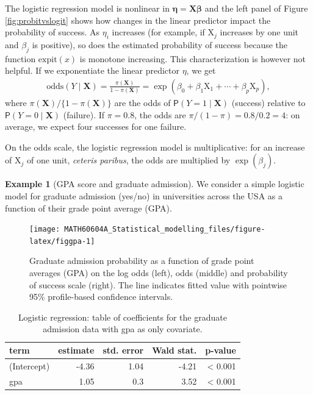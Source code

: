 \documentclass[
  11pt,
  letterpaper,
]{book}
\theoremstyle{definition}
\theoremstyle{definition}
\newtheorem{example}{Example}[chapter]
\theoremstyle{definition}
\theoremstyle{remark}
\begin{document}
The logistic regression model is nonlinear in \(\boldsymbol{\eta}=\mathbf{X}\boldsymbol{\beta}\) and the left panel of Figure \ref{fig:probitvslogit} shows how changes in the linear predictor impact the probability of success. As \(\eta_i\) increases (for example, if \(\mathrm{X}_j\) increases by one unit and \(\beta_j\) is positive), so does the estimated probability of success because the function \(\mathrm{expit}(x)\) is monotone increasing. This characterization is however not helpful.
If we exponentiate the linear predictor \(\eta\), we get
\begin{align*}
\mathrm{odds}(Y\mid \mathbf{X}) = \frac{\pi(\mathbf{X})}{1-\pi(\mathbf{X})}=\exp(\beta_0+ \beta_1 \mathrm{X}_1 + \cdots + \beta_p\mathrm{X}_p),
\end{align*}
where \(\pi(\mathbf{X})/\{1-\pi(\mathbf{X})\}\) are the odds of \(\mathsf{P}(Y=1 \mid \mathbf{X})\) (success) relative to \(\mathsf{P}(Y=0 \mid\mathbf{X})\) (failure). If \(\pi=0.8\), the odds are \(\pi/(1-\pi) = 0 .8/0.2 = 4\): on average, we expect four successes for one failure.

On the odds scale, the logistic regression model is multiplicative: for an increase of \(\mathrm{X}_j\) of one unit, \emph{ceteris paribus}, the odds are multiplied by \(\exp(\beta_j)\).

\begin{example}[GPA score and graduate admission]
\protect\hypertarget{exm:gpaexample}{}{\label{exm:gpaexample} {} }We consider a simple logistic model for graduate admission (yes/no) in universities across the USA as a function of their grade point average (GPA).
\end{example}

\begin{figure}

{\centering \texttt{[image: MATH60604A\_Statistical\_modelling\_files/figure-latex/figgpa-1]} 

}

\caption{Graduate admission probability as a function of grade point averages (GPA) on the log odds (left), odds (middle) and probability of success scale (right). The line indicates fitted value with pointwise 95\% profile-based confidence intervals.}\label{fig:figgpa}
\end{figure}

\begin{table}

\caption{\label{tab:gpatable}Logistic regression: table of coefficients for the graduate admission data with gpa as only covariate.}
\centering
\begin{tabular}[t]{lrrrr}
\toprule
term & estimate & std. error & Wald stat. & p-value\\
\midrule
(Intercept) & -4.36 & 1.04 & -4.21 & < 0.001\\
gpa & 1.05 & 0.3 & 3.52 & < 0.001\\
\bottomrule
\end{tabular}
\end{table}
\end{document}
